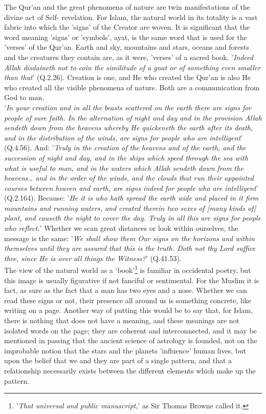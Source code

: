 \documentclass[10pt, twoside]{book}
\begin{document}
The Qur'an and the great phenomena of nature are twin manifestations of the divine act of Self\hyp{}
revelation. For Islam, the natural world in its totality is a vast fabric into which the 'signs' of 
the Creator are woven. It is significant that the word meaning 'signs' or 'symbols', ayat, is the 
same word that is used for the 'verses' of the Qur'an. Earth and sky, mountains and stars, oceans and 
forests and the creatures they contain are, as it were, 'verses' of a sacred book. '\emph{Indeed Allah 
disdaineth not to coin the similitude of a gnat or of something even smaller than that}' (Q.2.26). 
Creation is one, and He who created the Qur'an is also He who created all the visible phenomena of 
nature. Both are a communication from God to man. \\

'\emph{In your creation and in all the beasts scattered on the earth there are signs for people of sure 
faith. In the alternation of night and day and in the provision Allah sendeth down from the heavens 
whereby He quickeneth the earth after its death, and in the distribution of the winds, are signs for 
people who are intelligent}' (Q.4.56). And: '\emph{Truly in the creation of the heavens and of the earth, 
and the succession of night and day, and in the ships which speed through the sea with what is useful 
to man, and in the waters which Allah sendeth down from the heavens\ldots{} and in the order of the 
winds, and the clouds that run their appointed courses between heaven and earth, are signs indeed for 
people who are intelligent}' (Q.2.164). Because: '\emph{He it is who hath spread the earth wide and placed in it firm mountains and running waters, and created therein two sexes of [many kinds of] plant, and causeth the night to cover the day. Truly in all this are signs for people who reflect.}' Whether we 
scan great distances or look within ourselves, the message is the same: '\emph{We shall show them Our signs on the horizons and within themselves until they are assured that this is the truth. Doth not thy 
Lord suffice thee, since He is over all things the Witness?}' (Q.41.53). \\

The view of the natural world as a `book'\footnote{'\emph{That universal and public manuscript},' as Sir Thomas Browne called it.} is familiar in occidental poetry, but this image is usually figurative if not fanciful or sentimental. For the Muslim it is fact, as sure as the fact that a man has two eyes and a nose. Whether we can read these signs or not, their presence all around us is something concrete, like writing on a page. Another way of putting this would be to say that, for Islam, there is nothing that does not have a meaning, and these meanings are not isolated words on the page; they are coherent and interconnected, and it may be mentioned in passing that the ancient science of astrology is founded, not on the improbable notion that the stars and the planets 'influence' human lives, but upon the belief that we and they are part of a single pattern, and that a relationship necessarily exists between the different elements which make up the pattern. \\
\end{document}

